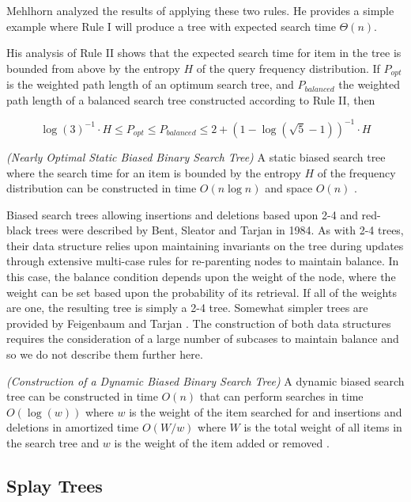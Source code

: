 \documentclass[mcs]{scsthesis}
\begin{document}
Mehlhorn \cite{mehlhorn} analyzed the results of applying these two rules. He
provides a simple example where Rule I will produce a tree with expected
search time \(\Theta(n)\).

His analysis of Rule II shows that the expected search time for item in the tree
is bounded from above by the entropy \(H\) of the query frequency distribution.
If $P_{opt}$ is the weighted path length of an optimum search tree, and
$P_{balanced}$ the weighted path length of a balanced search tree constructed
according to Rule II, then

$$
{\log(3)}^{-1} \cdot H \le P_{opt} \le P_{balanced} \le 2 + {(1 - \log(\sqrt 5 - 1))}^{-1} \cdot H
$$

\begin{thm} \emph{(Nearly Optimal Static Biased Binary Search Tree)} 
A static biased search tree where the search time for an item is bounded by
the entropy \(H\) of the frequency distribution can be constructed in time
\(O(n \log n)\) and space \(O(n)\) \cite{mehlhorn}.
\end{thm}

Biased search trees allowing insertions and deletions based upon 2-4 and
red-black trees were described by Bent, Sleator and Tarjan \cite{bst} in 1984.
As with 2-4 trees, their data structure relies upon maintaining invariants
on the tree during updates through extensive multi-case rules for re-parenting
nodes to maintain balance. In this case, the balance condition depends upon the
weight of the node, where the weight can be set based upon the probability of
its retrieval. If all of the weights are one, the resulting tree is simply a 2-4
tree. Somewhat simpler trees are provided by Feigenbaum and Tarjan \cite{bst2}.
The construction of both data structures requires the consideration of a large
number of subcases to maintain balance and so we do not describe them further
here.

\begin{thm} \emph{(Construction of a Dynamic Biased Binary Search Tree)} 
A dynamic biased search tree can be constructed in time \(O(n)\) that can
perform searches in time \(O(\log(w))\) where \(w\) is the weight of the item
searched for and insertions and deletions in amortized time \(O(W / w)\)
where \(W\) is the total weight of all items in the search tree and \(w\) is
the weight of the item added or removed \cite{bst2}.
\end{thm}

\subsection{Splay Trees}
\end{document}
